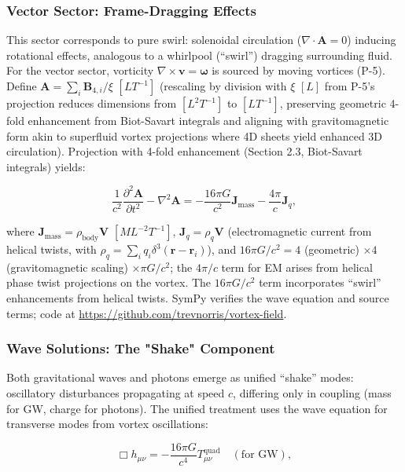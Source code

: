 \subsubsection{Vector Sector: Frame-Dragging Effects}

This sector corresponds to pure swirl: solenoidal circulation ($\nabla \cdot \mathbf{A} = 0$) inducing rotational effects, analogous to a whirlpool (``swirl'') dragging surrounding fluid. For the vector sector, vorticity $\nabla \times \mathbf{v} = \boldsymbol{\omega}$ is sourced by moving vortices (P-5). Define $\mathbf{A} = \sum_i \mathbf{B}_{4,i} / \xi$ $[L T^{-1}]$ (rescaling by division with $\xi$ $[L]$ from P-5's projection reduces dimensions from $[L^2 T^{-1}]$ to $[L T^{-1}]$, preserving geometric 4-fold enhancement from Biot-Savart integrals and aligning with gravitomagnetic form akin to superfluid vortex projections where 4D sheets yield enhanced 3D circulation). Projection with 4-fold enhancement (Section 2.3, Biot-Savart integrals) yields:

\begin{equation}
\frac{1}{c^2} \frac{\partial^2 \mathbf{A}}{\partial t^2} - \nabla^2 \mathbf{A} = -\frac{16\pi G}{c^2} \mathbf{J}_{\text{mass}} - \frac{4\pi}{c} \mathbf{J}_q,
\end{equation}

where $\mathbf{J}_{\text{mass}} = \rho_{\text{body}} \mathbf{V}$ $[M L^{-2} T^{-1}]$, $\mathbf{J}_q = \rho_q \mathbf{V}$ (electromagnetic current from helical twists, with $\rho_q = \sum_i q_i \delta^3(\mathbf{r} - \mathbf{r}_i)$), and $16\pi G/c^2 = 4$ (geometric) $\times 4$ (gravitomagnetic scaling) $\times \pi G/c^2$; the $4\pi/c$ term for EM arises from helical phase twist projections on the vortex. The $16\pi G/c^2$ term incorporates ``swirl'' enhancements from helical twists. SymPy verifies the wave equation and source terms; code at \url{https://github.com/trevnorris/vortex-field}.

\subsubsection{Wave Solutions: The "Shake" Component}

Both gravitational waves and photons emerge as unified ``shake'' modes: oscillatory disturbances propagating at speed $c$, differing only in coupling (mass for GW, charge for photons). The unified treatment uses the wave equation for transverse modes from vortex oscillations:

\begin{equation}
\Box h_{\mu\nu} = -\frac{16\pi G}{c^4} T_{\mu\nu}^{\text{quad}} \quad (\text{for GW}),
\end{equation}

